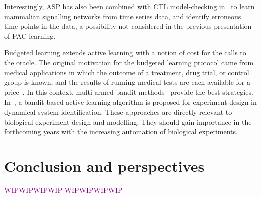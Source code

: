 \documentclass{llncs}
\newcommand{\wip}[1]{\textcolor{Purple}{WIPWIPWIPWIP #1 WIPWIPWIPWIP}}
\begin{document}
Interestingly, ASP has also been combined with CTL model-checking in~\cite{OPSSG16biosystems} to learn mammalian signalling networks from time series data,
and identify erroneous time-points in the data, a possibility not considered in the previous presentation of PAC learning.


Budgeted learning extends active learning with a notion of cost for the calls to the oracle.
The original motivation for the budgeted learning protocol came from medical applications in which the outcome of a treatment,
drug trial, or control group is known, and the results of running medical tests are each available for a price~\cite{DZBSM13ml}.
In this context, multi-armed bandit methods~\cite{DBSSZ07icdm} provide the best strategies.
In~\cite{LMALS14ecml}, a bandit-based active learning algorithm is proposed for experiment design in dynamical system identification.
These approaches are directly relevant to biological experiment design and modelling. %
They should gain importance in the forthcoming years with the increasing automation of biological experiments.





\section{Conclusion and perspectives}
\wip{}



\end{document}

